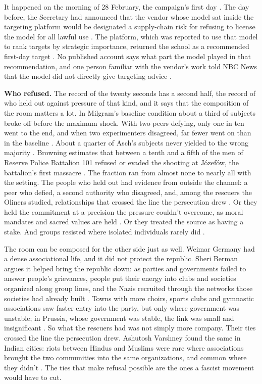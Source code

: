 It happened on the morning of 28 February, the campaign's first day \autocite{Amnesty2026Minab,crs2026iranwar}. The day before, the Secretary had announced that the vendor whose model sat inside the targeting platform would be designated a supply-chain risk for refusing to license the model for all lawful use \autocite{npr2026openai}. The platform, which was reported to use that model to rank targets by strategic importance, returned the school as a recommended first-day target \autocite{livingstone2026maven,gizmodo2026minab}. No published account says what part the model played in that recommendation, and one person familiar with the vendor's work told NBC News that the model did not directly give targeting advice \autocite{nbc2026targeting}.

\textbf{Who refused.} The record of the twenty seconds has a second half, the record of who held out against pressure of that kind, and it says that the composition of the room matters a lot. In Milgram's baseline condition about a third of subjects broke off before the maximum shock. With two peers defying, only one in ten went to the end, and when two experimenters disagreed, far fewer went on than in the baseline \autocite{milgram1974obedience}. About a quarter of Asch's subjects never yielded to the wrong majority \autocite{asch1956studies}. Browning estimates that between a tenth and a fifth of the men of Reserve Police Battalion 101 refused or evaded the shooting at Józefów, the battalion's first massacre \autocite{browning1992ordinary}. The fraction ran from almost none to nearly all with the setting. The people who held out had evidence from outside the channel: a peer who defied, a second authority who disagreed, and, among the rescuers the Oliners studied, relationships that crossed the line the persecution drew \autocite{oliner1988altruistic}. Or they held the commitment at a precision the pressure couldn't overcome, as moral mandates and sacred values are held \autocite{skitka2009limits,ginges2007sacred}. Or they treated the source as having a stake. And groups resisted where isolated individuals rarely did \autocite{gamson1982encounters}.

The room can be composed for the other side just as well. Weimar Germany had a dense associational life, and it did not protect the republic. Sheri Berman argues it helped bring the republic down: as parties and governments failed to answer people's grievances, people put their energy into clubs and societies organized along group lines, and the Nazis recruited through the networks those societies had already built \autocite{berman1997weimar}. Towns with more choirs, sports clubs and gymnastic associations saw faster entry into the party, but only where government was unstable; in Prussia, whose government was stable, the link was small and insignificant \autocite{satyanath2017bowling}. So what the rescuers had was not simply more company. Their ties crossed the line the persecution drew. Ashutosh Varshney found the same in Indian cities: riots between Hindus and Muslims were rare where associations brought the two communities into the same organizations, and common where they didn't \autocite{varshney2002ethnic}. The ties that make refusal possible are the ones a fascist movement would have to cut.

